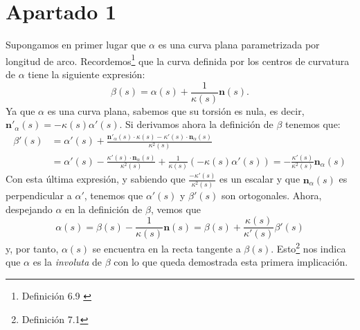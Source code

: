 \section{Apartado 1}
Supongamos en primer lugar que $\alpha$ es una curva plana parametrizada por
longitud de arco. Recordemos\footnote{Definición 6.9 \cite{sanjurjo}} que la
curva definida por los centros de curvatura de $\alpha$ tiene la siguiente
expresión:
\[
\beta\left( s \right) = \alpha\left( s \right) + \frac{1}{\kappa\left( s
\right)} \mathbf{n}\left( s \right).
\]
Ya que $\alpha$ es una curva plana, sabemos que su torsión es nula, es decir,
$\mathbf{n}'_{\alpha}\left( s \right) = - \kappa\left( s
\right)\alpha'\left( s \right)$. Si derivamos ahora la definición de $\beta$
tenemos que:
\begin{align*}
    \beta'\left( s \right) &= \alpha'\left( s \right) +
\frac{\mathbf{n}'_{\alpha}\left( s \right) \cdot \kappa\left( s \right) -
\kappa'\left( s \right) \cdot \mathbf{n}_{\alpha}\left( s
\right)}{\kappa^2\left( s \right)} \\
&= \alpha'\left( s \right) -
\frac{\kappa'\left( s \right) \cdot \mathbf{n}_{\alpha}\left( s
\right)}{\kappa^2\left( s \right)} + \frac{1}{\kappa\left( s \right)} \left(
-\kappa\left( s \right) \alpha'\left( s \right) \right) = \boxed{-\frac{\kappa'\left( s
\right)}{\kappa^2\left( s \right)} \mathbf{n}_{\alpha}\left( s \right)}
\end{align*}
Con esta última expresión, y sabiendo que $\frac{-\kappa'\left( s
\right)}{\kappa^2\left( s \right)}$ es un escalar y que
$\mathbf{n}_{\alpha}\left( s \right)$ es perpendicular a $\alpha'$, tenemos que
$\alpha'\left( s \right)$ y $\beta'\left( s \right)$ son ortogonales. Ahora,
despejando $\alpha$ en la definición de $\beta$, vemos que
\[
\alpha\left( s \right) = \beta\left( s \right) - \frac{1}{\kappa\left( s
\right)} \mathbf{n}\left( s \right) = \beta\left( s \right) + \frac{\kappa\left(
s\right)}{\kappa'\left( s \right)} \beta'\left( s \right)
\]
y, por tanto, $\alpha\left( s \right)$ se encuentra en la recta tangente a
$\beta\left( s \right)$. Esto\footnote{Definición 7.1\cite{sanjurjo}} nos indica
que $\alpha$ es la \textit{involuta} de $\beta$ con lo que queda demostrada esta
primera implicación.

